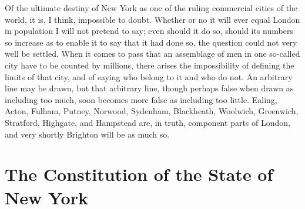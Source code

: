 Of the ultimate destiny of New York as one of the ruling commercial
cities of the world, it is, I think, impossible to doubt.  Whether
or no it will ever equal London in population I will not pretend to
say; even should it do so, should its numbers so increase as to
enable it to say that it had done so, the question could not very
well be settled.  When it comes to pass that an assemblage of men
in one so-called city have to be counted by millions, there arises
the impossibility of defining the limits of that city, and of
saying who belong to it and who do not.  An arbitrary line may be
drawn, but that arbitrary line, though perhaps false when drawn as
including too much, soon becomes more false as including too
little.  Ealing, Acton, Fulham, Putney, Norwood, Sydenham,
Blackheath, Woolwich, Greenwich, Stratford, Highgate, and Hampstead
are, in truth, component parts of London, and very shortly Brighton
will be as much so.



\chapter{The Constitution of the State of New York}


